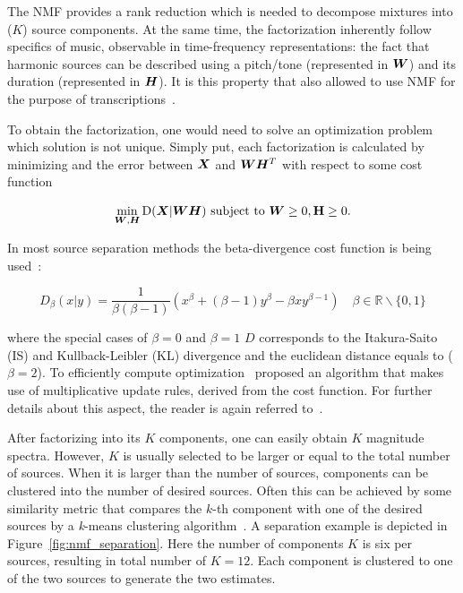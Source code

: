 The NMF provides a rank reduction which is needed to decompose mixtures into (\(K\)) source components.
At the same time, the factorization inherently follow specifics of music, observable in time-frequency representations: the fact that harmonic sources can be described using a pitch/tone (represented in \({\bm{W}}\)) and its duration (represented in \({\bm{H}}\)).
It is this property that also allowed to use NMF for the purpose of transcriptions~\cite{smaragdis03}.
\par
To obtain the factorization, one would need to solve an optimization problem which solution is not unique.
Simply put, each factorization is calculated by minimizing and the error between \({\bm{X}}\) and \({\bm{W}} {\bm{H}}^{T}\) with respect to some cost function

\begin{equation}
  \min_{{\bm{W}},{\bm{H}}} \mathrm{D}({\bm{X}} | {\bm{W}} {\bm{H}}) \text { subject to } {\bm{W}} \geq 0 , \mathbf {{\bm{H}}} \geq 0.
\end{equation}

In most source separation methods the beta-divergence cost function is being used~\cite{fitzgerald08a}:

\begin{equation}
  D_{\beta} (x | y) = \frac { 1 } { \beta ( \beta - 1 ) } \left( x ^ { \beta } + ( \beta - 1 ) y ^ { \beta } - \beta x y ^ { \beta - 1 } \right) \quad \beta \in \mathbb { R } \backslash \{ 0, 1 \}
\end{equation}

where the special cases of \(\beta = 0\) and \(\beta = 1\) \(D\) corresponds to the Itakura-Saito (IS) and Kullback-Leibler (KL) divergence and the euclidean distance equals to (\(\beta = 2\)).
To efficiently compute optimization~\cite{lee01} proposed an algorithm that makes use of multiplicative update rules, derived from the cost function. 
For further details about this aspect, the reader is again referred to~\cite{cichoki09}.
\par
After factorizing into its \(K\) components, one can easily obtain \(K\) magnitude spectra.
However, \(K\) is usually selected to be larger or equal to the total number of sources.
When it is larger than the number of sources, components can be clustered into the number of desired sources.
Often this can be achieved by some similarity metric that compares the \(k\)-th component with one of the desired sources by a \textit{k}-means clustering algorithm~\cite{spiertz09}.
A separation example is depicted in Figure~\ref{fig:nmf_separation}. 
Here the number of components \(K\) is six per sources, resulting in total number of \(K=12\). 
Each component is clustered to one of the two sources to generate the two estimates.

